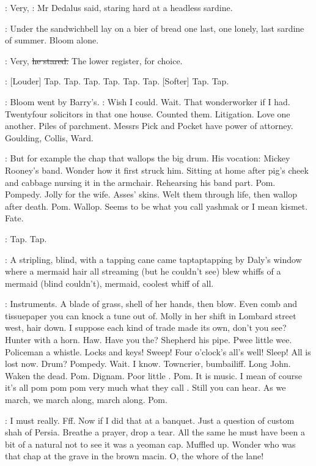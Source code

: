 \simon:
Very,
:
Mr Dedalus said,
staring hard at a headless sardine.

:
Under the sandwichbell
lay on a bier of bread one last,
one lonely,
last
sardine of summer.
Bloom alone.

\simon:
Very,
\sout{he stared.}
The lower register,
for choice.

\stripling:
[Louder] Tap.
Tap.
Tap.
Tap.
Tap.
Tap.
[Softer] Tap.
Tap.

:
Bloom went by Barry's.
\BloomInt:
Wish I could.
Wait.
That wonderworker if I
had.
Twentyfour solicitors in that one house.
Counted them.
Litigation.
Love one another.
Piles of parchment.
Messrs Pick and Pocket have power
of attorney.
Goulding,
Collis,
Ward.

\BloomInt:
But for example the chap that wallops the big drum.
His vocation:
Mickey Rooney's band.
Wonder how it first struck him.
Sitting at home
after pig's cheek and cabbage nursing it in the armchair.
Rehearsing his
band part.
Pom.
Pompedy.
Jolly for the wife.
Asses' skins.
Welt them
through life,
then wallop after death.
Pom.
Wallop.
Seems to be what you
call yashmak or I mean kismet.
Fate.

\stripling:
Tap.
Tap.

:
A stripling,
blind,
with a tapping cane came taptaptapping
by Daly's window where a mermaid hair all streaming (but he couldn't see)
blew whiffs of a mermaid (blind couldn't),
mermaid,
coolest whiff of all.

\BloomInt:
Instruments.
A blade of grass,
shell of her hands,
then blow.
Even
comb and tissuepaper you can knock a tune out of.
Molly in her shift in
Lombard street west,
hair down.
I suppose each kind of trade made its own,
don't you see?
Hunter with a horn.
Haw.
Have you the?
Shepherd his pipe.
Pwee little wee.
Policeman a whistle.
Locks and keys!
Sweep!
Four o'clock's all's well!
Sleep!
All is lost now.
Drum?
Pompedy.
Wait.
I know.
Towncrier,
bumbailiff.
Long John.
Waken the dead.
Pom.
Dignam.
Poor little .
Pom.
It is music.
I mean of course it's
all pom pom pom very much what they call
.
Still you can hear.
As
we march,
we march along,
march along.
Pom.

\BloomInt:
I must really.
Fff.
Now if I did that at a banquet.
Just a question of
custom shah of Persia.
Breathe a prayer,
drop a tear.
All the same he must
have been a bit of a natural not to see it was a yeoman cap.
Muffled up.
Wonder who was that chap at the grave in the brown macin.
O,
the whore of the lane!

